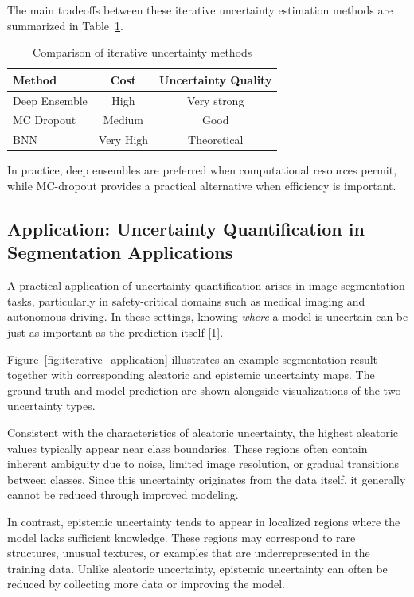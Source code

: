 \documentclass{article}
\renewcommand{\cite}[1]{[#1]}
\begin{document}
The main tradeoffs between these iterative uncertainty estimation methods are summarized in Table~\ref{tab:iter_uncertainty}.

\begin{table}[H]
\centering
\begin{tabular}{lcc}
Method & Cost & Uncertainty Quality \\
\hline
Deep Ensemble & High & Very strong \\
MC Dropout & Medium & Good \\
BNN & Very High & Theoretical
\end{tabular}
\caption{Comparison of iterative uncertainty methods}
\label{tab:iter_uncertainty}
\end{table}

In practice, deep ensembles are preferred when computational resources permit, while MC-dropout provides a practical alternative when efficiency is important.

\subsection{Application: Uncertainty Quantification in Segmentation Applications}

A practical application of uncertainty quantification arises in image segmentation tasks, particularly in safety-critical domains such as medical imaging and autonomous driving. In these settings, knowing \textit{where} a model is uncertain can be just as important as the prediction itself \cite{1}.

Figure~\ref{fig:iterative_application} illustrates an example segmentation result together with corresponding aleatoric and epistemic uncertainty maps. The ground truth and model prediction are shown alongside visualizations of the two uncertainty types.

Consistent with the characteristics of aleatoric uncertainty, the highest aleatoric values typically appear near class boundaries. These regions often contain inherent ambiguity due to noise, limited image resolution, or gradual transitions between classes. Since this uncertainty originates from the data itself, it generally cannot be reduced through improved modeling.

In contrast, epistemic uncertainty tends to appear in localized regions where the model lacks sufficient knowledge. These regions may correspond to rare structures, unusual textures, or examples that are underrepresented in the training data. Unlike aleatoric uncertainty, epistemic uncertainty can often be reduced by collecting more data or improving the model.
\end{document}
